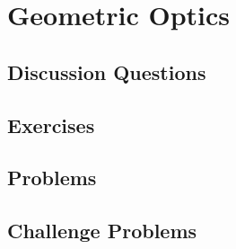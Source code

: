 
\chapter{Geometric Optics}

\section{Discussion Questions}

\section{Exercises}

\section{Problems}

\section{Challenge Problems}
